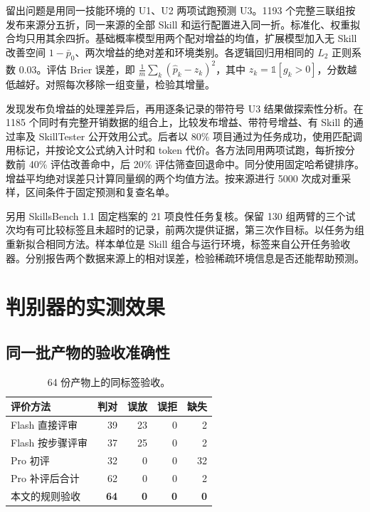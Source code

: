 \documentclass[final,5p,twocolumn,10pt]{elsarticle}
\begin{document}
留出问题是用同一技能环境的 U1、U2 两项试跑预测 U3。1193 个完整三联组按发布来源分五折，同一来源的全部 Skill 和运行配置进入同一折。标准化、权重拟合均只用其余四折。基础概率模型用两个配对增益的均值，扩展模型加入无 Skill 改善空间 $1-\bar p_0$、两次增益的绝对差和环境类别。各逻辑回归用相同的 $L_2$ 正则系数 0.03。评估 Brier 误差，即 $\frac{1}{m}\sum_k(\hat p_k-z_k)^2$，其中 $z_k=\mathbb{1}[g_k>0]$，分数越低越好。对照每次移除一组变量，检验其增量。

发现发布负增益的处理差异后，再用逐条记录的带符号 U3 结果做探索性分析。在 1185 个同时有完整开销数据的组合上，比较发布增益、带符号增益、有 Skill 的通过率及 SkillTester 公开效用公式。后者以 80\% 项目通过为任务成功，使用匹配调用标记，并按论文公式纳入计时和 token 代价。各方法同用两项试跑，每折按分数前 40\% 评估改善命中，后 20\% 评估筛查回退命中。同分使用固定哈希键排序。增益平均绝对误差只计算同量纲的两个均值方法。按来源进行 5000 次成对重采样，区间条件于固定预测和复查名单。

另用 SkillsBench 1.1 固定档案的 21 项良性任务复核。保留 130 组两臂的三个试次均有可比较标签且未超时的记录，前两次提供证据，第三次作目标。以任务为组重新拟合相同方法。样本单位是 Skill 组合与运行环境，标签来自公开任务验收器。分别报告两个数据来源上的相对误差，检验稀疏环境信息是否还能帮助预测。

\section{判别器的实测效果}

\subsection{同一批产物的验收准确性}

\begin{table}[!t]
\centering\small\setlength{\tabcolsep}{3pt}
\caption{64 份产物上的同标签验收。}
\label{tab:graders}
\begin{tabularx}{\columnwidth}{@{}Yrrrr@{}}
\toprule
评价方法 & 判对 & 误放 & 误拒 & 缺失 \\
\midrule
Flash 直接评审 & 39 & 23 & 0 & 2 \\
Flash 按步骤评审 & 37 & 25 & 0 & 2 \\
Pro 初评 & 32 & 0 & 0 & 32 \\
Pro 补评后合计 & 62 & 0 & 0 & 2 \\
本文的规则验收 & \textbf{64} & \textbf{0} & \textbf{0} & \textbf{0} \\
\bottomrule
\end{tabularx}
\end{table}
\end{document}
